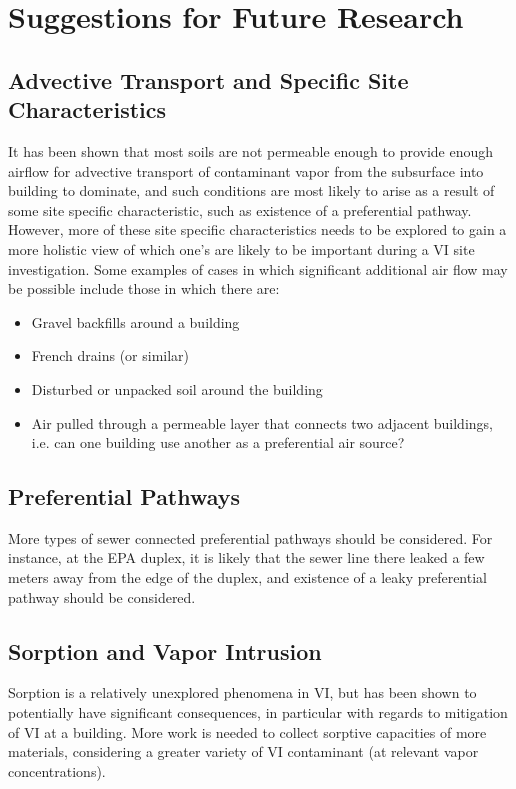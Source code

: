 \section{Suggestions for Future Research}

\subsection{Advective Transport and Specific Site Characteristics}

It has been shown that most soils are not permeable enough to provide enough airflow for advective transport of contaminant vapor from the subsurface into building to dominate, and such conditions are most likely to arise as a result of some site specific characteristic, such as existence of a preferential pathway.
However, more of these site specific characteristics needs to be explored to gain a more holistic view of which one's are likely to be important during a VI site investigation.
Some examples of cases in which significant additional air flow may be possible include those in which there are:
\begin{itemize}
  \item Gravel backfills around a building
  \item French drains (or similar)
  \item Disturbed or unpacked soil around the building
  \item Air pulled through a permeable layer that connects two adjacent buildings, i.e. can one building use another as a preferential air source?
\end{itemize}\par

\subsection{Preferential Pathways}

More types of sewer connected preferential pathways should be considered.
For instance, at the EPA duplex, it is likely that the sewer line there leaked a few meters away from the edge of the duplex, and existence of a leaky preferential pathway should be considered.\par

\subsection{Sorption and Vapor Intrusion}

Sorption is a relatively unexplored phenomena in VI, but has been shown to potentially have significant consequences, in particular with regards to mitigation of VI at a building.
More work is needed to collect sorptive capacities of more materials, considering a greater variety of VI contaminant (at relevant vapor concentrations).\par

